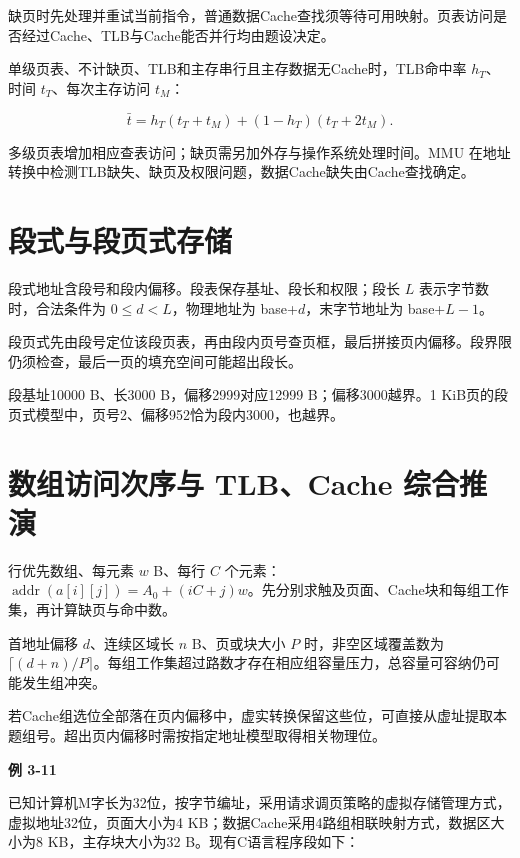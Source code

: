缺页时先处理并重试当前指令，普通数据Cache查找须等待可用映射。页表访问是否经过Cache、TLB与Cache能否并行均由题设决定。

单级页表、不计缺页、TLB和主存串行且主存数据无Cache时，TLB命中率 \(h_T\)、时间 \(t_T\)、每次主存访问 \(t_M\)：

\[\bar t=h_T(t_T+t_M)+(1-h_T)(t_T+2t_M).\]

多级页表增加相应查表访问；缺页需另加外存与操作系统处理时间。MMU 在地址转换中检测TLB缺失、缺页及权限问题，数据Cache缺失由Cache查找确定。

\section{段式与段页式存储}\label{CO03-segment}

段式地址含段号和段内偏移。段表保存基址、段长和权限；段长 \(L\) 表示字节数时，合法条件为 \(0\le d<L\)，物理地址为 base+\(d\)，末字节地址为 base+\(L-1\)。

段页式先由段号定位该段页表，再由段内页号查页框，最后拼接页内偏移。段界限仍须检查，最后一页的填充空间可能超出段长。

段基址10000 B、长3000 B，偏移2999对应12999 B；偏移3000越界。1 KiB页的段页式模型中，页号2、偏移952恰为段内3000，也越界。

\section{数组访问次序与 TLB、Cache 综合推演}\label{CO03-access}

行优先数组、每元素 \(w\) B、每行 \(C\) 个元素：\(\operatorname{addr}(a[i][j])=A_0+(iC+j)w\)。先分别求触及页面、Cache块和每组工作集，再计算缺页与命中数。

首地址偏移 \(d\)、连续区域长 \(n\) B、页或块大小 \(P\) 时，非空区域覆盖数为 \(\lceil(d+n)/P\rceil\)。每组工作集超过路数才存在相应组容量压力，总容量可容纳仍可能发生组冲突。

若Cache组选位全部落在页内偏移中，虚实转换保留这些位，可直接从虚址提取本题组号。超出页内偏移时需按指定地址模型取得相关物理位。

\par\medskip{}\noindent\hypertarget{CO03-E11}{}\label{CO03-E11}\textbf{例 3-11}\par\nobreak\smallskip

已知计算机M字长为32位，按字节编址，采用请求调页策略的虚拟存储管理方式，虚拟地址32位，页面大小为4 KB；数据Cache采用4路组相联映射方式，数据区大小为8 KB，主存块大小为32 B。现有C语言程序段如下：

